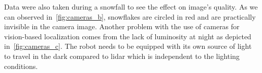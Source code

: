 Data were also taken during a snowfall to see the effect on image's quality. As we can observed in~\autoref{fig:cameras_b}, snowflakes are circled in red and are practically invisible in the camera image. Another problem with the use of cameras for vision-based localization comes from the lack of luminosity at night as depicted in~\autoref{fig:cameras_c}. The robot needs to be equipped with its own source of light to travel in the dark compared to lidar which is independent to the lighting conditions.


